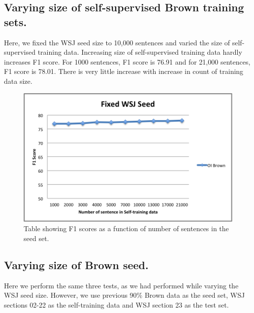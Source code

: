 \newpage

\subsection {Varying size of self-supervised Brown training sets.}

Here, we fixed the WSJ seed size to 10,000 sentences and varied the size of self-supervised training data. Increasing size of self-supervised training data hardly increases F1 score. For 1000 sentences, F1 score is 76.91 and for 21,000 sentences, F1 score is 78.01. There is very little increase with increase in count of training data size.

\begin{figure}[ht!]
\centering
\includegraphics[width=140mm]{exp2.png}
\caption{Table showing F1 scores as a function of number of sentences in the seed set. }
\label{accuracy}
\end{figure}

\newpage
\subsection {Varying size of Brown seed.}

Here we perform the same three tests, as we had performed while varying the WSJ seed size. However, we use previous 90\% Brown data as the seed set, WSJ sections 02-22 as the self-training data and WSJ section 23 as the test set.

